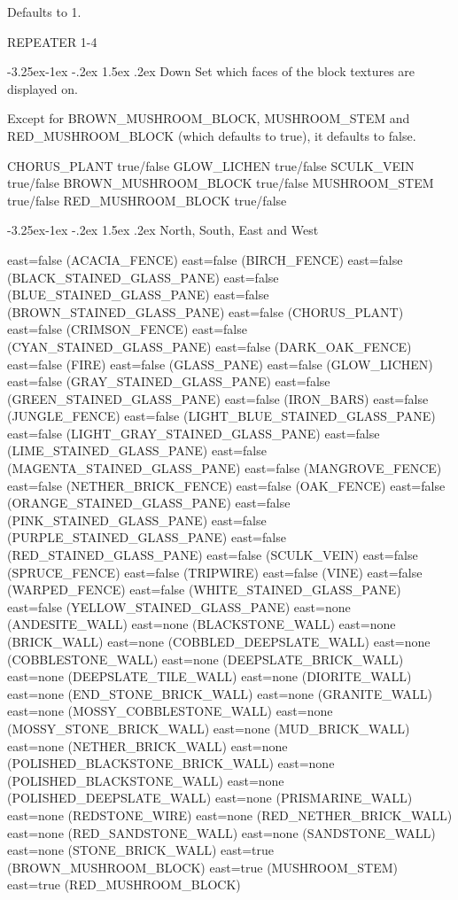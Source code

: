 \documentclass[11pt]{article}
\makeatletter
\renewcommand\subsubsection{\@startsection{subsubsection}{3}{\z@}%
                                        {-3.25ex\@plus -1ex \@minus -.2ex}%
                                         {1.5ex \@plus .2ex}%
                                         {\normalfont\normalsize\fontfamily{phv}\fontsize{14}{17}\selectfont}}
\makeatother
\begin{document}
Defaults to 1.

REPEATER 1-4

\subsubsection{Down}
Set which faces of the block textures are displayed on.

Except for BROWN\_MUSHROOM\_BLOCK, MUSHROOM\_STEM and RED\_MUSHROOM\_BLOCK (which defaults to true), it defaults to false.

CHORUS\_PLANT true/false
GLOW\_LICHEN true/false
SCULK\_VEIN true/false
BROWN\_MUSHROOM\_BLOCK true/false
MUSHROOM\_STEM true/false
RED\_MUSHROOM\_BLOCK true/false

\subsubsection{North, South, East and West}

east=false (ACACIA_FENCE)
east=false (BIRCH_FENCE)
east=false (BLACK_STAINED_GLASS_PANE)
east=false (BLUE_STAINED_GLASS_PANE)
east=false (BROWN_STAINED_GLASS_PANE)
east=false (CHORUS_PLANT)
east=false (CRIMSON_FENCE)
east=false (CYAN_STAINED_GLASS_PANE)
east=false (DARK_OAK_FENCE)
east=false (FIRE)
east=false (GLASS_PANE)
east=false (GLOW_LICHEN)
east=false (GRAY_STAINED_GLASS_PANE)
east=false (GREEN_STAINED_GLASS_PANE)
east=false (IRON_BARS)
east=false (JUNGLE_FENCE)
east=false (LIGHT_BLUE_STAINED_GLASS_PANE)
east=false (LIGHT_GRAY_STAINED_GLASS_PANE)
east=false (LIME_STAINED_GLASS_PANE)
east=false (MAGENTA_STAINED_GLASS_PANE)
east=false (MANGROVE_FENCE)
east=false (NETHER_BRICK_FENCE)
east=false (OAK_FENCE)
east=false (ORANGE_STAINED_GLASS_PANE)
east=false (PINK_STAINED_GLASS_PANE)
east=false (PURPLE_STAINED_GLASS_PANE)
east=false (RED_STAINED_GLASS_PANE)
east=false (SCULK_VEIN)
east=false (SPRUCE_FENCE)
east=false (TRIPWIRE)
east=false (VINE)
east=false (WARPED_FENCE)
east=false (WHITE_STAINED_GLASS_PANE)
east=false (YELLOW_STAINED_GLASS_PANE)
east=none (ANDESITE_WALL)
east=none (BLACKSTONE_WALL)
east=none (BRICK_WALL)
east=none (COBBLED_DEEPSLATE_WALL)
east=none (COBBLESTONE_WALL)
east=none (DEEPSLATE_BRICK_WALL)
east=none (DEEPSLATE_TILE_WALL)
east=none (DIORITE_WALL)
east=none (END_STONE_BRICK_WALL)
east=none (GRANITE_WALL)
east=none (MOSSY_COBBLESTONE_WALL)
east=none (MOSSY_STONE_BRICK_WALL)
east=none (MUD_BRICK_WALL)
east=none (NETHER_BRICK_WALL)
east=none (POLISHED_BLACKSTONE_BRICK_WALL)
east=none (POLISHED_BLACKSTONE_WALL)
east=none (POLISHED_DEEPSLATE_WALL)
east=none (PRISMARINE_WALL)
east=none (REDSTONE_WIRE)
east=none (RED_NETHER_BRICK_WALL)
east=none (RED_SANDSTONE_WALL)
east=none (SANDSTONE_WALL)
east=none (STONE_BRICK_WALL)
east=true (BROWN_MUSHROOM_BLOCK)
east=true (MUSHROOM_STEM)
east=true (RED_MUSHROOM_BLOCK)
\end{document}
